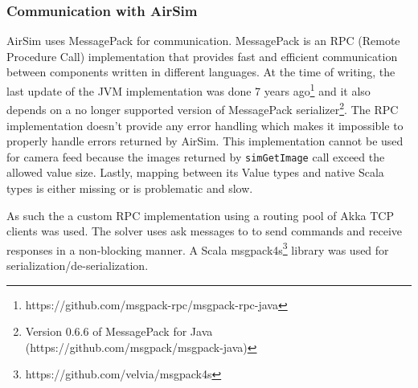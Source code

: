 \documentclass{article}
\let\cite\citep
\begin{document}
\subsubsection{Communication with AirSim}
AirSim uses MessagePack \cite{messagepack} for communication. MessagePack is an RPC (Remote Procedure Call) implementation that provides fast and efficient communication between components written in different languages. At the time of writing, the last update of the JVM implementation was done 7 years ago\footnote{https://github.com/msgpack-rpc/msgpack-rpc-java} and it also depends on a no longer supported version of MessagePack serializer\footnote{Version 0.6.6 of MessagePack for Java (https://github.com/msgpack/msgpack-java)}. The RPC implementation doesn't provide any error handling which makes it impossible to properly handle errors returned by AirSim. This implementation cannot be used for camera feed because the images returned by \verb|simGetImage| call exceed the allowed value size. Lastly, mapping between its Value types and native Scala types is either missing or is problematic and slow.  

As such the a custom RPC implementation using a routing pool of Akka TCP clients was used. The solver uses ask messages to to send commands and receive responses in a non-blocking manner. A Scala msgpack4s\footnote{https://github.com/velvia/msgpack4s} library was used for serialization/de-serialization.


\end{document}
